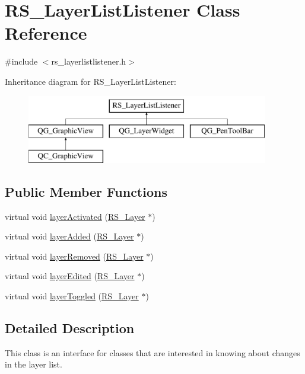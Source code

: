 \hypertarget{classRS__LayerListListener}{\section{R\-S\-\_\-\-Layer\-List\-Listener Class Reference}
\label{classRS__LayerListListener}
}


{\ttfamily \#include $<$rs\-\_\-layerlistlistener.\-h$>$}

Inheritance diagram for R\-S\-\_\-\-Layer\-List\-Listener\-:\begin{figure}[H]
\begin{center}
\leavevmode
\includegraphics[height=3.000000cm]{classRS__LayerListListener}
\end{center}
\end{figure}
\subsection*{Public Member Functions}
\begin{DoxyCompactItemize}
\item 
virtual void \hyperlink{classRS__LayerListListener_a09ebd52346c417fe0e82876cc0abc59e}{layer\-Activated} (\hyperlink{classRS__Layer}{R\-S\-\_\-\-Layer} $\ast$)
\item 
virtual void \hyperlink{classRS__LayerListListener_a0dcaa002205a13589a576eebc1723153}{layer\-Added} (\hyperlink{classRS__Layer}{R\-S\-\_\-\-Layer} $\ast$)
\item 
virtual void \hyperlink{classRS__LayerListListener_a1135bfb08284866a5ea1190213b3e761}{layer\-Removed} (\hyperlink{classRS__Layer}{R\-S\-\_\-\-Layer} $\ast$)
\item 
virtual void \hyperlink{classRS__LayerListListener_a6953aab6245c88b0bed2f25493522791}{layer\-Edited} (\hyperlink{classRS__Layer}{R\-S\-\_\-\-Layer} $\ast$)
\item 
virtual void \hyperlink{classRS__LayerListListener_a159ef2488a66a30c08b050e277083c25}{layer\-Toggled} (\hyperlink{classRS__Layer}{R\-S\-\_\-\-Layer} $\ast$)
\end{DoxyCompactItemize}


\subsection{Detailed Description}
This class is an interface for classes that are interested in knowing about changes in the layer list. 

